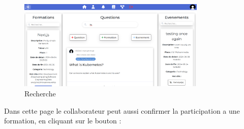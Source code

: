 \documentclass{article}
\begin{document}
                \begin{figure}[h!]
                    \centering
                    \includegraphics[width=0.8\textwidth]{assets/webSite/search.png}
                    \caption{Recherche}
                \end{figure}
                \FloatBarrier 
                \newpage
                Dans cette page le collaborateur peut aussi confirmer la participation a une formation, en cliquant sur le bouton :
\end{document}
